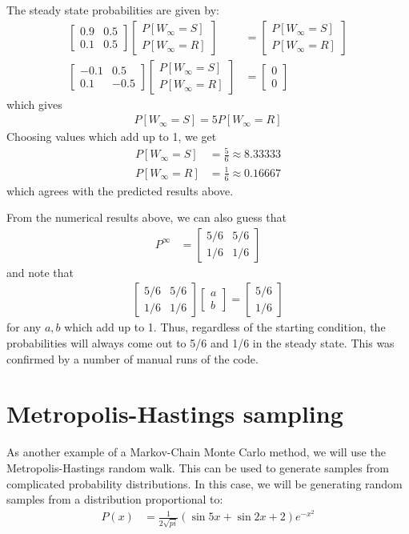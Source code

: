 \documentclass[twocolumn]{myarticle}
\newcommand{\mat}[1]{\begin{bmatrix}#1\end{bmatrix}}
\begin{document}
The steady state probabilities are given by:
\begin{align}
    \mat{0.9 & 0.5 \\ 0.1 & 0.5} \mat{P[W_\infty = S] \\ P[W_\infty = R]} &= \mat{P[W_\infty = S] \\ P[W_\infty = R]}
    \\
    \mat{-0.1 & 0.5 \\ 0.1 & -0.5} \mat{P[W_\infty = S] \\ P[W_\infty = R]} &= \mat{0 \\ 0}
\end{align}
which gives
\begin{align}
    P[W_\infty = S] = 5 P[W_\infty = R] 
\end{align}
Choosing values which add up to 1, we get
\begin{align}
    P[W_\infty = S] &= \frac{5}{6} \approx 8.33333
    \\
    P[W_\infty = R] &= \frac{1}{6} \approx 0.16667
\end{align}
which agrees with the predicted results above.

From the numerical results above, we can also guess that
\begin{align}
    P^\infty &= \mat{5/6 & 5/6 \\ 1/6 & 1/6}
\end{align}
and note that
\begin{align}
    \mat{5/6 & 5/6 \\ 1/6 & 1/6} \mat{a \\ b} = \mat{5/6 \\ 1/6}
\end{align}
for any $ a, b $ which add up to 1.
Thus, regardless of the starting condition, the probabilities will always come out to 5/6 and 1/6 in the steady state.
This was confirmed by a number of manual runs of the code.

\section{Metropolis-Hastings sampling}
\label{sec:metropolis_hastings_sampling}

As another example of a Markov-Chain Monte Carlo method, we will use the Metropolis-Hastings random walk.
This can be used to generate samples from complicated probability distributions.
In this case, we will be generating random samples from a distribution proportional to:
\begin{align}
    P(x) &= \frac{1}{2 \sqrt{pi}} \left( \sin 5x + \sin 2x + 2 \right) e^{-x^2}
    \label{eq:p_of_x}
\end{align}
\end{document}
